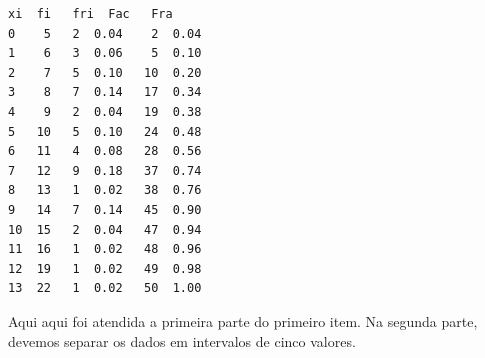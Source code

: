 ﻿\documentclass[11pt]{article}
\makeatletter
\newcommand{\boxspacing}{\kern\kvtcb@left@rule\kern\kvtcb@boxsep}
\newcommand{\prompt}[4]{
        {\ttfamily\llap{{\color{#2}[#3]:\hspace{3pt}#4}}\vspace{-\baselineskip}}
    }
\makeatother
\begin{document}
            \begin{tcolorbox}[breakable, size=fbox, boxrule=.5pt, pad at break*=1mm, opacityfill=0]
\prompt{Out}{outcolor}{1}{\boxspacing}
\begin{Verbatim}[commandchars=\\\{\}]
    xi  fi   fri  Fac   Fra
0    5   2  0.04    2  0.04
1    6   3  0.06    5  0.10
2    7   5  0.10   10  0.20
3    8   7  0.14   17  0.34
4    9   2  0.04   19  0.38
5   10   5  0.10   24  0.48
6   11   4  0.08   28  0.56
7   12   9  0.18   37  0.74
8   13   1  0.02   38  0.76
9   14   7  0.14   45  0.90
10  15   2  0.04   47  0.94
11  16   1  0.02   48  0.96
12  19   1  0.02   49  0.98
13  22   1  0.02   50  1.00
\end{Verbatim}
\end{tcolorbox}
        
    Aqui aqui foi atendida a primeira parte do primeiro item. Na segunda
parte, devemos separar os dados em intervalos de cinco valores.
\end{document}
